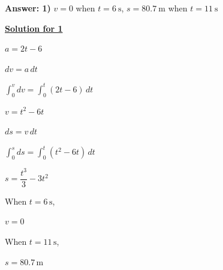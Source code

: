 \textbf{Answer: 1)} $v = 0$ when $t = 6 \ \text{s}$, $s = 80.7 \ \text{m}$ when $t = 11 \ \text{s}$

\underline{\textbf{Solution for 1}}

$a = 2t - 6$

$dv = a \, dt$

$\int_{0}^{v} dv = \int_{0}^{t} (2t - 6) \, dt$

$v = t^2 - 6t$

$ds = v \, dt$

$\int_{0}^{s} ds = \int_{0}^{t} (t^2 - 6t) \, dt$

$s = \dfrac{t^3}{3} - 3t^2$

When $t = 6 \, \text{s}$,

$v = 0$

When $t = 11 \, \text{s}$,

$s = 80.7 \, \text{m}$